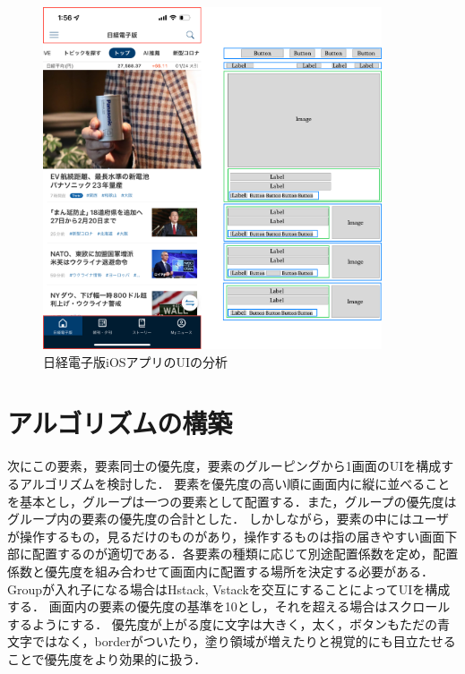 \begin{figure}[htbp]
  \begin{minipage}{\hsize}
    \begin{center}
       \includegraphics[width=100mm]{img/nikkei_analyze.png}
    \end{center}
    \caption{日経電子版iOSアプリのUIの分析}
    \label{fig:nikkei_analyze}
  \end{minipage}
\end{figure}

\section{アルゴリズムの構築}
次にこの要素，要素同士の優先度，要素のグルーピングから1画面のUIを構成するアルゴリズムを検討した．
要素を優先度の高い順に画面内に縦に並べることを基本とし，グループは一つの要素として配置する．また，グループの優先度はグループ内の要素の優先度の合計とした．
しかしながら，要素の中にはユーザが操作するもの，見るだけのものがあり，操作するものは指の届きやすい画面下部に配置するのが適切である．各要素の種類に応じて別途配置係数を定め，配置係数と優先度を組み合わせて画面内に配置する場所を決定する必要がある．
Groupが入れ子になる場合はHstack, Vstackを交互にすることによってUIを構成する．
画面内の要素の優先度の基準を10とし，それを超える場合はスクロールするようにする．
優先度が上がる度に文字は大きく，太く，ボタンもただの青文字ではなく，borderがついたり，塗り領域が増えたりと視覚的にも目立たせることで優先度をより効果的に扱う．

